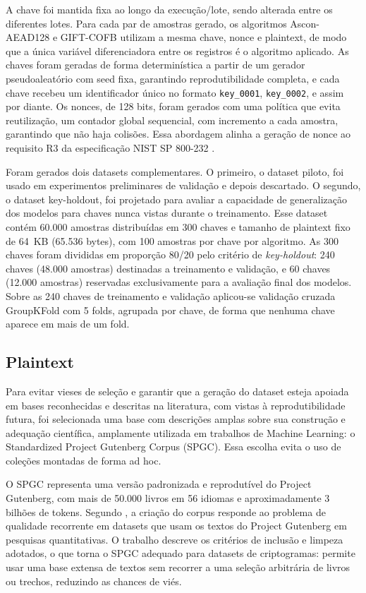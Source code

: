 A chave foi mantida fixa ao longo da execução/lote, sendo alterada entre os diferentes lotes. Para cada par de amostras gerado, os algoritmos Ascon-AEAD128 e GIFT-COFB utilizam a mesma chave, nonce e plaintext, de modo que a única variável diferenciadora entre os registros é o algoritmo aplicado. As chaves foram geradas de forma determinística a partir de um gerador pseudoaleatório com seed fixa, garantindo reprodutibilidade completa, e cada chave recebeu um identificador único no formato \texttt{key\_0001}, \texttt{key\_0002}, e assim por diante. Os nonces, de 128 bits, foram gerados com uma política que evita reutilização, um contador global sequencial, com incremento a cada amostra, garantindo que não haja colisões. Essa abordagem alinha a geração de nonce ao requisito R3 da especificação NIST SP 800-232 \cite{nist_sp800232_2025}.

Foram gerados dois datasets complementares. O primeiro, o dataset piloto, foi usado em experimentos preliminares de validação e depois descartado. O segundo, o dataset key-holdout, foi projetado para avaliar a capacidade de generalização dos modelos para chaves nunca vistas durante o treinamento. Esse dataset contém 60.000 amostras distribuídas em 300 chaves e tamanho de plaintext fixo de 64~KB (65.536 bytes), com 100 amostras por chave por algoritmo. As 300 chaves foram divididas em proporção 80/20 pelo critério de \textit{key-holdout}: 240 chaves (48.000 amostras) destinadas a treinamento e validação, e 60 chaves (12.000 amostras) reservadas exclusivamente para a avaliação final dos modelos. Sobre as 240 chaves de treinamento e validação aplicou-se validação cruzada GroupKFold com 5 folds, agrupada por chave, de forma que nenhuma chave aparece em mais de um fold.

\subsection{Plaintext}
Para evitar vieses de seleção e garantir que a geração do dataset esteja apoiada em bases reconhecidas e descritas na literatura, com vistas à reprodutibilidade futura, foi selecionada uma base com descrições amplas sobre sua construção e adequação científica, amplamente utilizada em trabalhos de Machine Learning: o Standardized Project Gutenberg Corpus (SPGC). Essa escolha evita o uso de coleções montadas de forma ad hoc.

O SPGC representa uma versão padronizada e reprodutível do Project Gutenberg, com mais de 50.000 livros em 56 idiomas e aproximadamente 3 bilhões de tokens. Segundo \cite{Gerlach2018ASP}, a criação do corpus responde ao problema de qualidade recorrente em datasets que usam os textos do Project Gutenberg em pesquisas quantitativas. O trabalho descreve os critérios de inclusão e limpeza adotados, o que torna o SPGC adequado para datasets de criptogramas: permite usar uma base extensa de textos sem recorrer a uma seleção arbitrária de livros ou trechos, reduzindo as chances de viés.

